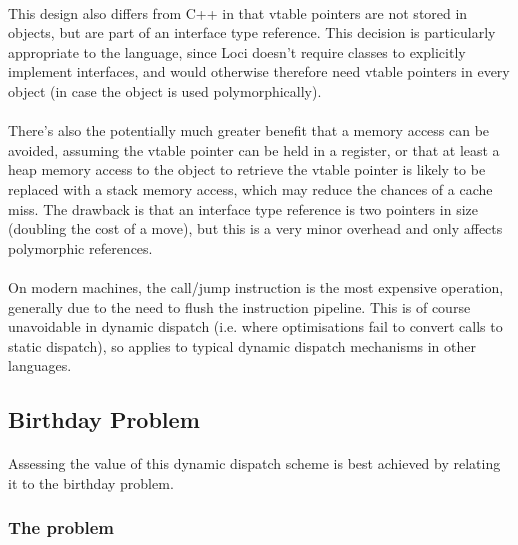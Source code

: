\documentclass[12pt,twoside,notitlepage]{report}
\begin{document}
\paragraph{}
This design also differs from C++ in that vtable pointers are not stored in objects, but are part of an interface type reference. This decision is particularly appropriate to the language, since Loci doesn't require classes to explicitly implement interfaces, and would otherwise therefore need vtable pointers in every object (in case the object is used polymorphically).

\paragraph{}
There's also the potentially much greater benefit that a memory access can be avoided, assuming the vtable pointer can be held in a register, or that at least a heap memory access to the object to retrieve the vtable pointer is likely to be replaced with a stack memory access, which may reduce the chances of a cache miss. The drawback is that an interface type reference is two pointers in size (doubling the cost of a move), but this is a very minor overhead and only affects polymorphic references.

\paragraph{}
On modern machines, the call/jump instruction is the most expensive operation, generally due to the need to flush the instruction pipeline. This is of course unavoidable in dynamic dispatch (i.e. where optimisations fail to convert calls to static dispatch), so applies to typical dynamic dispatch mechanisms in other languages.

\subsection{Birthday Problem}

\paragraph{}
Assessing the value of this dynamic dispatch scheme is best achieved by relating it to the birthday problem.

\subsubsection{The problem}
\end{document}
